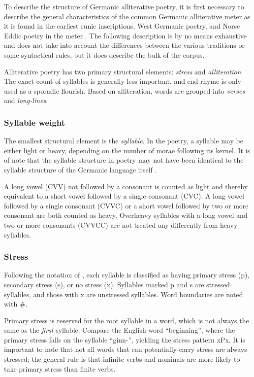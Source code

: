     To describe the structure of Germanic alliterative poetry, it is first necessary to describe the general characteristics of the common Germanic alliterative meter as it is found in the earliest runic inscriptions, West Germanic poetry, and Norse Eddic poetry in the meter \Fornyrdislag.  The following description is by no means exhaustive and does not take into account the differences between the various traditions or some syntactical rules, but it does describe the bulk of the corpus.

    Alliterative poetry has two primary structural elements: \emph{stress} and \emph{alliteration}.  The exact count of syllables is generally less important, and end-rhyme is only used as a sporadic flourish.
    Based on alliteration, words are grouped into \emph{verses} and \emph{long-lines}.

    \subsubsection{Syllable weight}

    The smallest structural element is the \emph{syllable}.  In the poetry, a syllable may be either light or heavy, depending on the number of morae following its kernel.  It is of note that the syllable structure in poetry may not have been identical to the syllable structure of the Germanic language itself \parencite{Goering2023Prosody}.

    A long vowel (CVV) not followed by a consonant is counted as light and thereby equivalent to a short vowel followed by a single consonant (CVC).  A long vowel followed by a single consonant (CVVC) or a short vowel followed by two or more consonant are both counted as heavy.  Overheavy syllables with a long vowel and two or more consonants (CVVCC) are not treated any differently from heavy syllables.

    \subsubsection{Stress}

    Following the notation of , each syllable is classified as having primary stress (p), secondary stress (s), or no stress (x).  Syllables marked p and s are stressed syllables, and those with x are unstressed syllables.  Word boundaries are noted with \#.

    Primary stress is reserved for the root syllable in a word, which is not always the same as the \emph{first} syllable.  Compare the English word “beginning”, where the primary stress falls on the syllable “ginn-”, yielding the stress pattern xPx.  It is important to note that not all words that can potentially carry stress are always stressed; the general rule is that infinite verbs and nominals are more likely to take primary stress than finite verbs.

